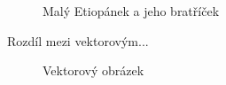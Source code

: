 \documentclass[a4paper,11pt, hidelinks]{article}
\begin{document}
\begin{figure}[h]
    \caption{Malý Etiopánek a jeho bratříček}
    \label{img:1}
\end{figure}

\newpage

Rozdíl mezi vektorovým...
\begin{figure}[h]
    \centering
    \caption{Vektorový obrázek}
    \label{img:2}
\end{figure}
\end{document}
